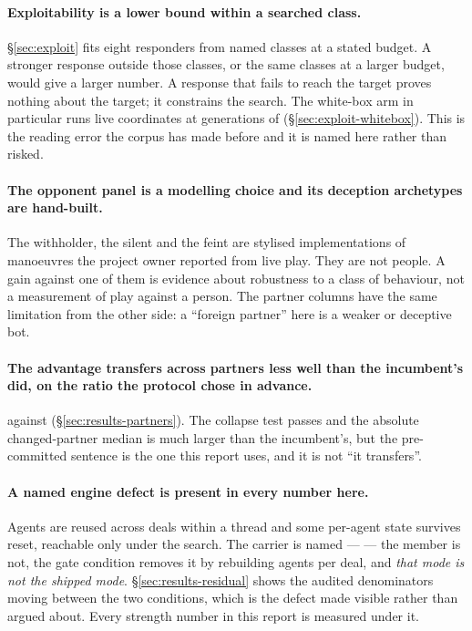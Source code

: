 \paragraph{Exploitability is a lower bound within a searched class.}
\label{sec:limitations-lbr}
\S\ref{sec:exploit} fits eight responders from named classes at a stated budget. A stronger response
outside those classes, or the same classes at a larger budget, would give a larger number. A response
that fails to reach the target proves nothing about the target; it constrains the search. The white-box
arm in particular runs \vsevenZeightLive{} live coordinates at \vsevenBfourGens{} generations of
\vsevenBfourPop{}
(\S\ref{sec:exploit-whitebox}). This is the reading error the corpus has made before and it is named
here rather than risked.

\paragraph{The opponent panel is a modelling choice and its deception archetypes are hand-built.}
The withholder, the silent and the feint are stylised implementations of manoeuvres the project owner
reported from live play. They are not people. A gain against one of them is evidence about robustness
to a class of behaviour, not a measurement of play against a person. The partner columns have the same
limitation from the other side: a ``foreign partner'' here is a weaker or deceptive bot.

\paragraph{The advantage transfers across partners less well than the incumbent's did, on the ratio
the protocol chose in advance.}
\vsevenSoneRatio{} against \vsevenBaseRatio{} (\S\ref{sec:results-partners}). The collapse test passes
and the absolute changed-partner median is much larger than the incumbent's, but the pre-committed
sentence is the one this report uses, and it is not ``it transfers''.

\paragraph{A named engine defect is present in every number here.}
Agents are reused across deals within a thread and some per-agent state survives reset, reachable only
under the search. The carrier is named --- \texttt{\vsevenSsixCarrier{}} --- the member is not, the
gate condition removes it by rebuilding agents per deal, and \emph{that mode is not the shipped mode}.
\S\ref{sec:results-residual} shows the audited denominators moving between the two conditions, which is
the defect made visible rather than argued about. Every strength number in this report is measured
under it.

